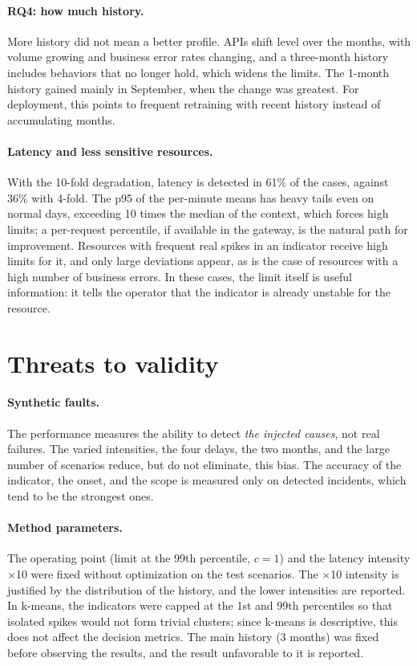\documentclass[sigconf,nonacm]{acmart}
\begin{document}
\paragraph{RQ4: how much history.} More history did not mean a better profile. APIs shift level over the months, with volume growing and business error rates changing, and a three-month history includes behaviors that no longer hold, which widens the limits. The 1-month history gained mainly in September, when the change was greatest. For deployment, this points to frequent retraining with recent history instead of accumulating months.

\paragraph{Latency and less sensitive resources.} With the 10-fold degradation, latency is detected in 61\% of the cases, against 36\% with 4-fold. The p95 of the per-minute means has heavy tails even on normal days, exceeding 10 times the median of the context, which forces high limits; a per-request percentile, if available in the gateway, is the natural path for improvement. Resources with frequent real spikes in an indicator receive high limits for it, and only large deviations appear, as is the case of resources with a high number of business errors. In these cases, the limit itself is useful information: it tells the operator that the indicator is already unstable for the resource.

\section{Threats to validity}\label{sec:ameacas}

\paragraph{Synthetic faults.} The performance measures the ability to detect \emph{the injected causes}, not real failures. The varied intensities, the four delays, the two months, and the large number of scenarios reduce, but do not eliminate, this bias. The accuracy of the indicator, the onset, and the scope is measured only on detected incidents, which tend to be the strongest ones.

\paragraph{Method parameters.} The operating point (limit at the 99th percentile, $c=1$) and the latency intensity $\times$10 were fixed without optimization on the test scenarios. The $\times$10 intensity is justified by the distribution of the history, and the lower intensities are reported. In k-means, the indicators were capped at the 1st and 99th percentiles so that isolated spikes would not form trivial clusters; since k-means is descriptive, this does not affect the decision metrics. The main history (3 months) was fixed before observing the results, and the result unfavorable to it is reported.
\end{document}
